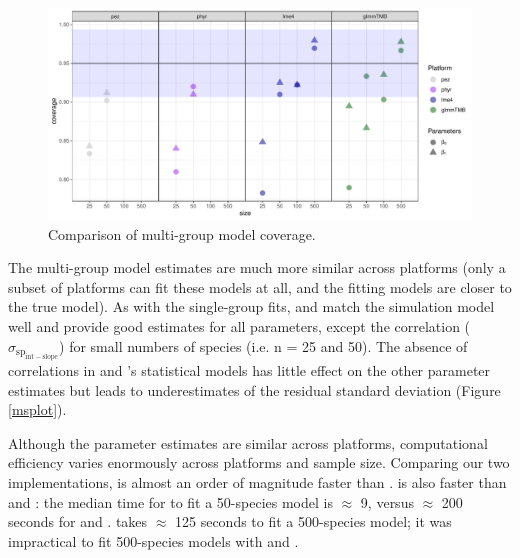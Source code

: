\documentclass[12pt]{article}
\begin{document}
\begin{center}
\begin{figure}[H]
  \includegraphics[scale=0.7]{./figure/mscoverage.pdf}
  \caption{Comparison of multi-group model coverage.}
  \label{msplot_coverage}
\end{figure}
\end{center}

The multi-group model estimates are much more similar across platforms (only a subset of platforms can fit these models at all, and the fitting models are closer to the true model).
As with the single-group fits,  and  match the simulation model well and provide good estimates for all parameters, except the correlation ($\sigma_{\mathrm{sp_{int-slope}}}$) for small numbers of species (i.e. n = 25 and 50).
The absence of correlations in  and 's statistical models has little effect on the other parameter estimates but leads to underestimates of the residual standard deviation (Figure \ref{msplot}).

Although the parameter estimates are similar across platforms, computational efficiency varies enormously across platforms and sample size.
Comparing our two implementations,  is almost an order of magnitude faster than .
 is also faster than  and : the median time for  to fit a 50-species model is $\approx$ 9, versus $\approx$ 200 seconds for  and .
 takes $\approx$ 125 seconds to fit a 500-species model; it was impractical to fit 500-species models with  and .

\end{document}
